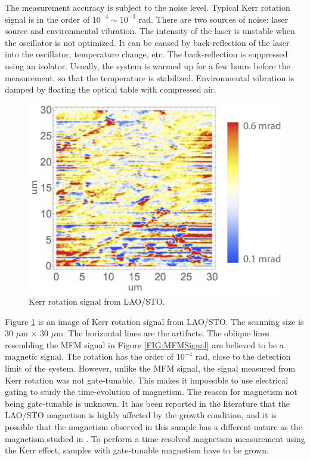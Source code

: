 \documentclass[pdflatex, sectionletters, 12pt, final, phd]{pittetd}    %
\begin{document}
The measurement accuracy is subject to the noise level. Typical Kerr rotation signal is in the order of $10^{-4} \sim 10^{-3}$ rad. There are two sources of noise: laser source and environmental vibration. The intensity of the laser is unstable when the oscillator is not optimized. It can be caused by back-reflection of the laser into the oscillator, temperature change, etc. The back-reflection is suppressed using an isolator. Usually, the system is warmed up for a few hours before the measurement, so that the temperature is stabilized. Environmental vibration is damped by floating the optical table with compressed air.

\begin{figure}[h!]
	\centering
	\includegraphics[width=.6\textwidth]{Drawing/KerrLAOSTO.pdf}
	\caption[Kerr rotation signal from LAO/STO]{Kerr rotation signal from LAO/STO.}
	\label{FIG:KerrLAOSTO}
\end{figure}

Figure \ref{FIG:KerrLAOSTO} is an image of Kerr rotation signal from LAO/STO. The scanning size is 30 $\mu$m $\times$ 30 $\mu$m. The horizontal lines are the artifacts. The oblique lines resembling the MFM signal in Figure \ref{FIG:MFMSignal} are believed to be a magnetic signal. The rotation has the order of $10^{-4}$ rad, close to the detection limit of the system. However, unlike the MFM signal, the signal measured from Kerr rotation was not gate-tunable. This makes it impossible to use electrical gating to study the time-evolution of magnetism. The reason for magnetism not being gate-tunable is unknown. It has been reported in the literature that the LAO/STO magnetism is highly affected by the growth condition\cite{ariando2011electronic, salluzzo2013origin, huijben2009structure, liu2014dominant}, and it is possible that the magnetism observed in this sample has a different nature as the magnetism studied in \cite{bi2014room}. To perform a time-resolved magnetism measurement using the Kerr effect, samples with gate-tunable magnetism have to be grown.
\end{document}
